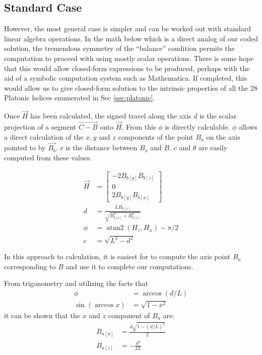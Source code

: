 \documentclass[11pt]{article}
\DeclareMathOperator{\atantwo}{atan2}
\begin{document}
{\subsection{Standard Case}

However, the most general case is simpler and can be worked
out with standard linear algebra operations. In the math below
which is a direct analog of our coded solution, the tremendous symmetry of the ``balance'' condition
permits the computation to proceed with
using mostly scalar operations. There is some hope that
this would allow closed-form expressions to be produced, perhaps
with the aid of a symbolic computation system such as
Mathematica\cite{Mathematica}. If completed, this would
allow us to give closed-form solution to the intrinsic properties
of all the 28 Platonic helices enumerated in Sec \ref{sec:platonic}.

Once $\overrightarrow{H}$ has been calculated, the signed travel along the axis $d$ is
the scalar projection of a segment $\overrightarrow{C - B}$ onto $\overrightarrow{H}$.
From this $\phi$ is directly calculable. $\phi$ allows
a direct calculation of the $x,y$ and $z$ components of the
point $B_a$ on the axis pointed to by $\overrightarrow{B_b}$.
$r$ is the distance between $B_a$ and $B$. $c$ and $\theta$
are easily computed from these values.

\begin{align}
  \overrightarrow{H} &=  \begin{bmatrix} -2 B_{b[y]} B_{b[z]} \\ 0 \\ 2 B_{b[y]} B_{b[x]}  \end{bmatrix} \\
  d &= \frac{L B_{b[x]}}{\sqrt{B_{b[x]}^2 + B_{b[z]}^2}}  \\
  \phi &= \atantwo{(H_z,H_x)} - \pi/2  \\
  c &= \sqrt{L^2 - d^2}
\end{align}

In this approach to calculation, it is easiest for
to compute the axis point $B_a$ corresponding to $B$ and
use it to complete our computations.

From trigonometry and utilizing the facts that
\begin{align}
\phi &= \arccos{(d/L)} \\
\sin{(\arccos{x})} &= \sqrt{1 - x^2}
\end{align}
  it
can be shown that
the $x$ and $z$ component of $B_a$ are:
\begin{align}
  B_{a[x]} &= \frac{d\sqrt{1 - (d/L)^2}}{2} \\
  B_{a[z]} &= -\frac{d^2}{2L}
\end{align}

}
\end{document}
